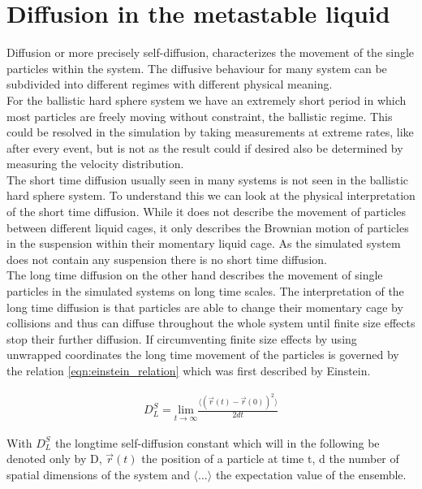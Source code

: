 \section{Diffusion in the metastable liquid}
\label{sec:diffusion_metastable_liquid}
Diffusion or more precisely self-diffusion, characterizes the movement of the single particles within the system. The diffusive behaviour for many system can be subdivided into different regimes with different physical meaning.\\ 

For the ballistic hard sphere system we have an extremely short period in which most particles are freely moving without constraint, the ballistic regime. This could be resolved in the simulation by taking measurements at extreme rates, like after every event, but is not as the result could if desired also be determined by measuring the velocity distribution.\\ 

The short time diffusion usually seen in many systems is not seen in the ballistic hard sphere system. To understand this we can look at the physical interpretation of the short time diffusion. While it does not describe the movement of particles between different liquid cages, it only describes the Brownian motion of particles in the suspension within their momentary liquid cage. As the simulated system does not contain any suspension there is no short time diffusion.\\

The long time diffusion on the other hand describes the movement of single particles in the simulated systems on long time scales. The interpretation of the long time diffusion is that particles are able to change their momentary cage by collisions and thus can diffuse throughout the whole system until finite size effects stop their further diffusion. If circumventing finite size effects by using unwrapped coordinates the long time movement of the particles is governed by the relation \autoref{eqn:einstein_relation} which was first described by Einstein\cite{Albert1905}.

\begin{align}
\label{eqn:einstein_relation}
D^S_L = \underset{t\rightarrow \infty}{\text{lim}} \frac{\langle (\vec{r}(t) - \vec{r}(0) )^2 \rangle}{2 d t}
\end{align}

With $D^S_L$ the longtime self-diffusion constant which will in the following be denoted only by D, $\vec{r}(t)$ the position of a particle at time t, d the number of spatial dimensions of the system and $\langle ... \rangle$ the expectation value of the ensemble.\\

